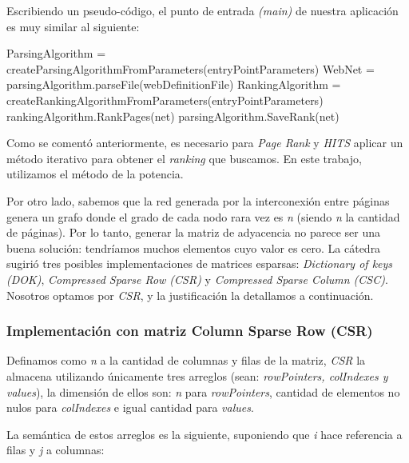 	Escribiendo un pseudo-código, el punto de entrada \textit{(main)} de nuestra aplicación es muy similar al siguiente:

	\vspace{\baselineskip}
	\begin{codebox}
	\li ParsingAlgorithm  = createParsingAlgorithmFromParameters(entryPointParameters)
	\li WebNet  = parsingAlgorithm.parseFile(webDefinitionFile)
	\li RankingAlgorithm  = createRankingAlgorithmFromParameters(entryPointParameters)
	\li rankingAlgorithm.RankPages(net)
	\li parsingAlgorithm.SaveRank(net)
	\End
	\end{codebox} 
	\vspace{\baselineskip}

	Como se comentó anteriormente, es necesario para \textit{Page Rank} y \textit{HITS} aplicar un método iterativo para obtener el \textit{ranking} que buscamos. En este trabajo, utilizamos el método de la potencia. 

	Por otro lado, sabemos que la red generada por la interconexión entre páginas genera un grafo donde el grado de cada nodo rara vez es \textit{n} (siendo \textit{n} la cantidad de páginas). Por lo tanto, generar la matriz de adyacencia no parece ser una buena solución: tendríamos muchos elementos cuyo valor es cero. La cátedra sugirió tres posibles implementaciones de matrices esparsas: \textit{Dictionary of keys (DOK)}, \textit{Compressed Sparse Row (CSR)} y \textit{Compressed Sparse Column (CSC)}. Nosotros optamos por \textit{CSR}, y la justificación la detallamos a continuación.

\subsubsection{Implementación con matriz Column Sparse Row (CSR)}

	Definamos como \textit{n} a la cantidad de columnas y filas de la matriz, \textit{CSR} la almacena utilizando únicamente tres arreglos (sean: \textit{rowPointers, colIndexes y values}), la dimensión de ellos son: \textit{n} para \textit{rowPointers}, cantidad de elementos no nulos para \textit{colIndexes} e igual cantidad para \textit{values}.

	La semántica de estos arreglos es la siguiente, suponiendo que \textit{i} hace referencia a filas y \textit{j} a columnas:

